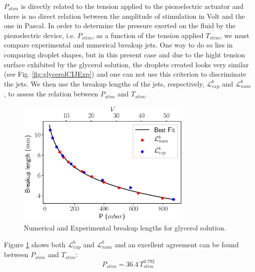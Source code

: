 \documentclass[twocolumn,10pt]{asme2ej}
\begin{document}
$P_{stim}$ is directly related to the tension applied to the piezoelectric actuator and there is no direct relation between the amplitude of stimulation in Volt and the one in Pascal. In order to determine the pressure exerted on the fluid by the piezoelectric device, i.e. $P_{stim}$, as a function of the tension applied $T_{stim}$, we must compare experimental and numerical breakup jets. One way to do so lies in comparing droplet shapes, but in this present case and due to the hight tension surface exhibited by the glycerol solution, the droplets created looks very similar (see Fig. \ref{fig:glycerolCIJExp}) and one can not use this criterion to discriminate the jets. We then use the breakup lengths of the jets, respectively, $\mathcal{L}_{exp}^b$ and $\mathcal{L}_{num}^b$, to assess the relation between $P_{stim}$ and $T_{stim}$. 

\begin{figure}[h]
    \centering
    \includegraphics[width=8.5cm]{LbGlycerol.eps}
    \caption{Numerical and Experimental breakup lengths for glycerol solution.}
    \label{fig:LbGlycerol}
\end{figure}

Figure \ref{fig:LbGlycerol} shows both $\mathcal{L}_{exp}^b$ and $\mathcal{L}_{num}^b$ and an excellent agreement can be found between $P_{stim}$ and $T_{stim}$:
\begin{equation}
    P_{stim} = 36.4 \, T_{stim}^{0.792}
\end{equation}
\end{document}
